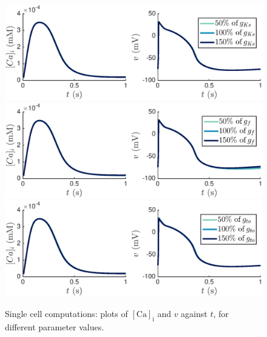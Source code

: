 \documentclass{article}
\begin{document}
%
\begin{figure}
   \includegraphics[trim=0cm 0cm 0cm 0cm, clip=true, width=1\linewidth]{sc_gks} 
   \includegraphics[trim=0cm 0cm 0cm 0cm, clip=true, width=1\linewidth]{sc_gf} 
      \includegraphics[trim=0cm 0cm 0cm 0cm, clip=true, width=1\linewidth]{sc_gto} 
    \caption{Single cell computations: plots of $[\mathrm{Ca}]_{\mathrm{i}}$ and $v$  against $t$, for different parameter values.}
    \label{fig:5a}
\end{figure}
%
\end{document}
